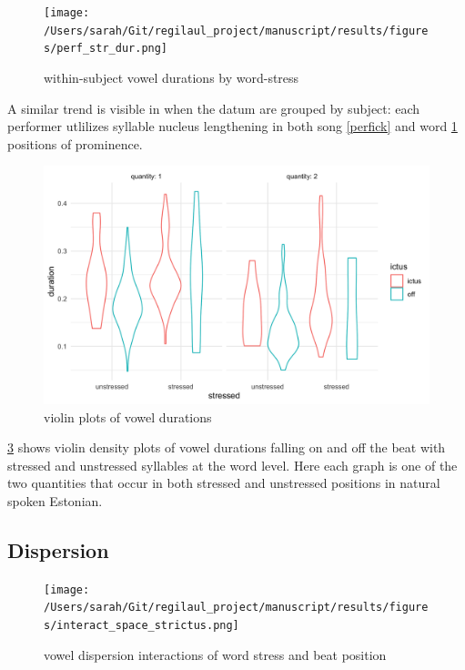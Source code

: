 \begin{figure}[htb]
\begin{center}
\texttt{[image: /Users/sarah/Git/regilaul\_project/manuscript/results/figures/perf\_str\_dur.png]}


\caption{within-subject vowel durations by word-stress}
\label{perfstr}
\end{center}
\end{figure}

A similar trend is visible in  when the datum are grouped by subject: each performer utlilizes syllable nucleus lengthening in both song \ref{perfick} and word \ref{perfstr} positions of prominence. 

\begin{figure}[htb]
\begin{center}
\includegraphics[width=\textwidth]{figures/dur_density_qfac.png}


\caption{violin plots of vowel durations}
\label{density}
\end{center}
\end{figure}

\ref{density} shows violin density plots of vowel durations falling on and off the beat with stressed and unstressed syllables at the word level. Here each graph is one of the two quantities that occur in both stressed and unstressed positions in natural spoken Estonian. 
\subsection{Dispersion}
\begin{figure}[htb]
\begin{center}
\texttt{[image: /Users/sarah/Git/regilaul\_project/manuscript/results/figures/interact\_space\_strictus.png]}


\caption{vowel dispersion interactions of word stress and beat position}
\label{density}
\end{center}
\end{figure}

